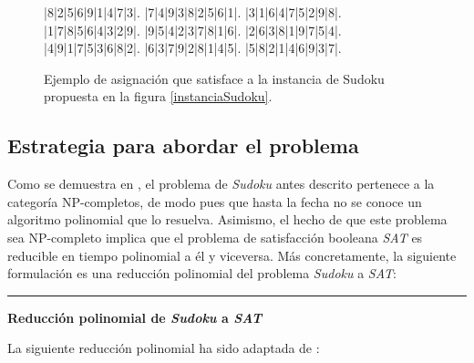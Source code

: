 \documentclass[12pt,lettersize,oneside]{article}
\begin{document}
\begin{figure}\caption{Ejemplo de asignación que satisface a la instancia de
    Sudoku propuesta en la figura \ref{instanciaSudoku}.}
\label{solSudoku}
\setlength\sudokusize{6.5cm}
\begin{sudoku}
|8|2|5|6|9|1|4|7|3|.
|7|4|9|3|8|2|5|6|1|.
|3|1|6|4|7|5|2|9|8|.
|1|7|8|5|6|4|3|2|9|.
|9|5|4|2|3|7|8|1|6|.
|2|6|3|8|1|9|7|5|4|.
|4|9|1|7|5|3|6|8|2|.
|6|3|7|9|2|8|1|4|5|.
|5|8|2|1|4|6|9|3|7|.
\end{sudoku}
\end{figure}

\vspace{-2.5mm}

\subsection{Estrategia para abordar el problema}

Como se demuestra en \cite{YatoSeta}, el problema de \emph{Sudoku} antes
descrito pertenece a la categoría NP-completos, de modo pues que hasta la fecha
no se conoce un algoritmo polinomial que lo resuelva. Asimismo, el hecho de que
este problema sea NP-completo implica que el problema de satisfacción booleana
\emph{SAT} es reducible en tiempo polinomial a él y viceversa. Más
concretamente, la siguiente formulación es una reducción polinomial del problema
\emph{Sudoku} a \emph{SAT}:

\rule{4cm}{0.3mm}

\textbf{Reducción polinomial de \emph{Sudoku} a \emph{SAT} }

La siguiente reducción polinomial ha sido adaptada de \cite{url}:
\vspace{-2.5mm}
\end{document}

